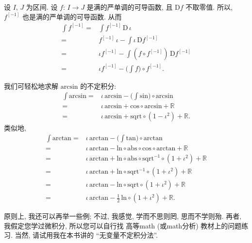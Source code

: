 \begin{example}
    设 $I$, $J$ 为区间.
    设 $f$: $I \to J$ 是满的严单调的可导函数,
    且 $\mathrm{D}f$ 不取零值.
    所以, $f^{[-1]}$ 也是满的严单调的可导函数.
    从而
    \begin{align*}
        \int {f^{[-1]}}
        = {} & \int {f^{[-1]}\, \mathrm{D}\,\iota}                            \\
        = {} & f^{[-1]}\,\iota - \int {\iota\,\mathrm{D}f^{[-1]}}             \\
        = {} & \iota f^{[-1]} - \int {(f \circ f^{[-1]})\,\mathrm{D}f^{[-1]}} \\
        = {} & \iota f^{[-1]} - \Bigg( \int {f} \Bigg) \circ f^{[-1]}.
    \end{align*}
\end{example}

\begin{example}
    我们可轻松地求解 $\mathrm{arcsin}$ 的不定积分:
    \begin{align*}
        \int {\mathrm{arcsin}}
        = {} & \iota\, \mathrm{arcsin} - \Bigg( \int {\mathrm{sin}} \Bigg) \circ \mathrm{arcsin} \\
        = {} & \iota\, \mathrm{arcsin} + \mathrm{cos} \circ \mathrm{arcsin} + \mathbb{R}         \\
        = {} & \iota\, \mathrm{arcsin} + \mathrm{sqrt} \circ (1 - \iota^2) + \mathbb{R}.
    \end{align*}
    类似地,
    \begin{align*}
        \int {\mathrm{arctan}}
        = {} & \iota\, \mathrm{arctan} - \Bigg( \int {\mathrm{tan}} \Bigg) \circ \mathrm{arctan}                                  \\
        = {} & \iota\, \mathrm{arctan} - \mathrm{ln} \circ \mathrm{abs} \circ \mathrm{cos} \circ \mathrm{arctan} + \mathbb{R}     \\
        = {} & \iota\, \mathrm{arctan} + \mathrm{ln} \circ \mathrm{abs} \circ \mathrm{sqrt}^{-1} \circ (1 + \iota^2) + \mathbb{R} \\
        = {} & \iota\, \mathrm{arctan} + \mathrm{ln} \circ \mathrm{sqrt}^{-1} \circ (1 + \iota^2) + \mathbb{R}                    \\
        = {} & \iota\, \mathrm{arctan} - \mathrm{ln} \circ \mathrm{sqrt} \circ (1 + \iota^2) + \mathbb{R}                         \\
        = {} & \iota\, \mathrm{arctan} - \frac{1}{2}\,\mathrm{ln} \circ (1 + \iota^2) + \mathbb{R}.
    \end{align*}
\end{example}

原则上, 我还可以再举一些例;
不过, 我感觉, 学而不思则罔, 思而不学则殆.
再者, 我假定您学过微积分,
所以您可以自行找%
高等\gls{math} (或\gls{math}分析) 教材上的问题练习.
当然, 请试用我在本书讲的 ``无变量不定积分法''.
